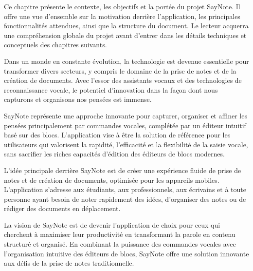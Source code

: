 

\noindent
Ce chapitre présente le contexte, les objectifs et la portée du projet SayNote. Il offre une vue d'ensemble sur la motivation derrière l'application, les principales fonctionnalités attendues, ainsi que la structure du document. Le lecteur acquerra une compréhension globale du projet avant d'entrer dans les détails techniques et conceptuels des chapitres suivants.

\thispagestyle{fancy}

\vspace{1cm}

Dans un monde en constante évolution, la technologie est devenue essentielle pour transformer divers secteurs, y compris le domaine de la prise de notes et de la création de documents. Avec l'essor des assistants vocaux et des technologies de reconnaissance vocale, le potentiel d'innovation dans la façon dont nous capturons et organisons nos pensées est immense.

SayNote représente une approche innovante pour capturer, organiser et affiner les pensées principalement par commandes vocales, complétée par un éditeur intuitif basé sur des blocs. L'application vise à être la solution de référence pour les utilisateurs qui valorisent la rapidité, l'efficacité et la flexibilité de la saisie vocale, sans sacrifier les riches capacités d'édition des éditeurs de blocs modernes.

\vspace{0.5cm}

L'idée principale derrière SayNote est de créer une expérience fluide de prise de notes et de création de documents, optimisée pour les appareils mobiles. L'application s'adresse aux étudiants, aux professionnels, aux écrivains et à toute personne ayant besoin de noter rapidement des idées, d'organiser des notes ou de rédiger des documents en déplacement.

\vspace{0.5cm}

La vision de SayNote est de devenir l'application de choix pour ceux qui cherchent à maximiser leur productivité en transformant la parole en contenu structuré et organisé. En combinant la puissance des commandes vocales avec l'organisation intuitive des éditeurs de blocs, SayNote offre une solution innovante aux défis de la prise de notes traditionnelle.

\vspace{1cm}

